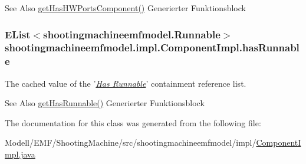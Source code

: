 \begin{DoxySeeAlso}{See Also}
\hyperlink{classshootingmachineemfmodel_1_1impl_1_1_component_impl_a278ec36c9c5c095e447ab6623e7c5900}{get\-Has\-H\-W\-Ports\-Component()} Generierter Funktionsblock  
\end{DoxySeeAlso}
\hypertarget{classshootingmachineemfmodel_1_1impl_1_1_component_impl_ade2868233b071fba708d74f608e7103a}{
\subsubsection[{has\-Runnable}]{\setlength{\rightskip}{0pt plus 5cm}E\-List$<${\bf shootingmachineemfmodel.\-Runnable}$>$ shootingmachineemfmodel.\-impl.\-Component\-Impl.\-has\-Runnable\hspace{0.3cm}{\ttfamily [protected]}}}\label{classshootingmachineemfmodel_1_1impl_1_1_component_impl_ade2868233b071fba708d74f608e7103a}
The cached value of the '\hyperlink{classshootingmachineemfmodel_1_1impl_1_1_component_impl_ad5149ad613dfe9c0e5fdd8db70d7df1d}{{\itshape Has Runnable}}' containment reference list.

\begin{DoxySeeAlso}{See Also}
\hyperlink{classshootingmachineemfmodel_1_1impl_1_1_component_impl_ad5149ad613dfe9c0e5fdd8db70d7df1d}{get\-Has\-Runnable()} Generierter Funktionsblock  
\end{DoxySeeAlso}


The documentation for this class was generated from the following file\-:\begin{DoxyCompactItemize}
\item 
Modell/\-E\-M\-F/\-Shooting\-Machine/src/shootingmachineemfmodel/impl/\hyperlink{_component_impl_8java}{Component\-Impl.\-java}\end{DoxyCompactItemize}
